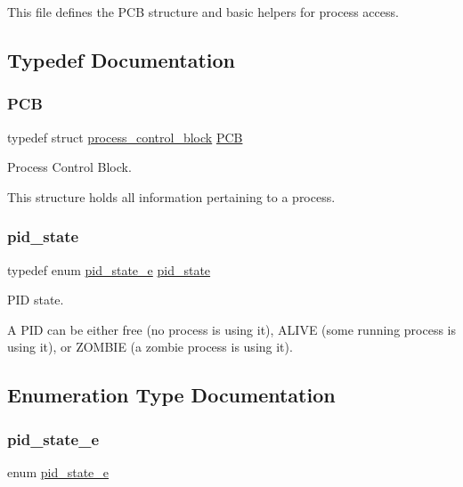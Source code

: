 This file defines the P\+CB structure and basic helpers for process access. 

\subsection{Typedef Documentation}
\mbox{\label{group__proc_gadf327f09ee935cf1734c14e8849f0421}} 
\subsubsection{\texorpdfstring{P\+CB}{PCB}}
{\footnotesize\ttfamily typedef struct \hyperlink{structprocess__control__block}{process\+\_\+control\+\_\+block}  \hyperlink{group__proc_gadf327f09ee935cf1734c14e8849f0421}{P\+CB}}



Process Control Block. 

This structure holds all information pertaining to a process. \mbox{\label{group__proc_gade1eea4d20492c4c97263201145e5097}} 
\subsubsection{\texorpdfstring{pid\+\_\+state}{pid\_state}}
{\footnotesize\ttfamily typedef enum \hyperlink{group__proc_ga4f133ac5f9b2ca9c1446889baee1dc05}{pid\+\_\+state\+\_\+e}  \hyperlink{group__proc_gade1eea4d20492c4c97263201145e5097}{pid\+\_\+state}}



P\+ID state. 

A P\+ID can be either free (no process is using it), A\+L\+I\+VE (some running process is using it), or Z\+O\+M\+B\+IE (a zombie process is using it). 

\subsection{Enumeration Type Documentation}
\mbox{\label{group__proc_ga4f133ac5f9b2ca9c1446889baee1dc05}} 
\subsubsection{\texorpdfstring{pid\+\_\+state\+\_\+e}{pid\_state\_e}}
{\footnotesize\ttfamily enum \hyperlink{group__proc_ga4f133ac5f9b2ca9c1446889baee1dc05}{pid\+\_\+state\+\_\+e}}



